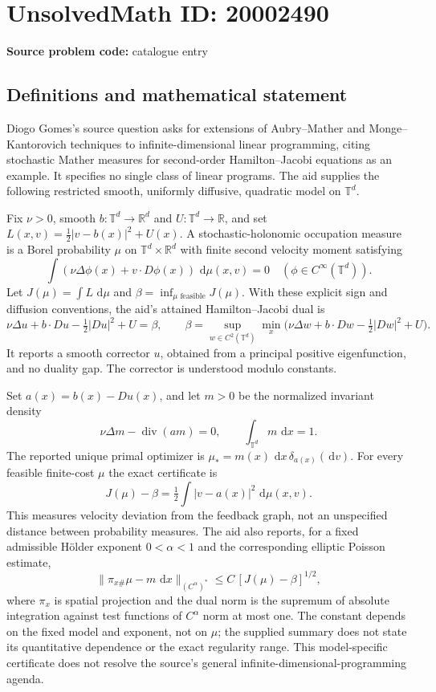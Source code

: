 \documentclass[11pt]{article}
\newcommand{\R}{\mathbb{R}}
\newcommand{\dd}{\,\mathrm{d}}
\begin{document}
\section*{UnsolvedMath ID: 20002490}
\textbf{Source problem code:} catalogue entry
\subsection{Definitions and mathematical statement}
Diogo Gomes's source question asks for extensions of Aubry--Mather and Monge--Kantorovich techniques to infinite-dimensional linear programming, citing stochastic Mather measures for second-order Hamilton--Jacobi equations as an example. It specifies no single class of linear programs. The aid supplies the following restricted smooth, uniformly diffusive, quadratic model on $\mathbb T^d$.

Fix $\nu>0$, smooth $b:\mathbb T^d\to\R^d$ and $U:\mathbb T^d\to\R$, and set $L(x,v)=\tfrac12|v-b(x)|^2+U(x)$. A stochastic-holonomic occupation measure is a Borel probability $\mu$ on $\mathbb T^d\times\R^d$ with finite second velocity moment satisfying
\[
 \int(\nu\Delta\phi(x)+v\cdot D\phi(x))\,\dd\mu(x,v)=0
 \quad(\phi\in C^\infty(\mathbb T^d)).
\]
Let $J(\mu)=\int L\,\dd\mu$ and $\beta=\inf_{\mu\text{ feasible}}J(\mu)$. With these explicit sign and diffusion conventions, the aid's attained Hamilton--Jacobi dual is
\[
 \nu\Delta u+b\cdot Du-\tfrac12|Du|^2+U=\beta,
 \qquad
 \beta=\sup_{w\in C^2(\mathbb T^d)}\min_x
 \bigl(\nu\Delta w+b\cdot Dw-\tfrac12|Dw|^2+U\bigr).
\]
It reports a smooth corrector $u$, obtained from a principal positive eigenfunction, and no duality gap. The corrector is understood modulo constants.

Set $a(x)=b(x)-Du(x)$, and let $m>0$ be the normalized invariant density
\[
 \nu\Delta m-\operatorname{div}(a m)=0,\qquad\int_{\mathbb T^d}m\,\dd x=1.
\]
The reported unique primal optimizer is $\mu_*=m(x)\,\dd x\,\delta_{a(x)}(\dd v)$. For every feasible finite-cost $\mu$ the exact certificate is
\[
 J(\mu)-\beta=\tfrac12\int|v-a(x)|^2\,\dd\mu(x,v).
\]
This measures velocity deviation from the feedback graph, not an unspecified distance between probability measures. The aid also reports, for a fixed admissible H\"older exponent $0<\alpha<1$ and the corresponding elliptic Poisson estimate,
\[
 \|\pi_{x\#}\mu-m\,\dd x\|_{(C^\alpha)^*}
 \le C\,[J(\mu)-\beta]^{1/2},
\]
where $\pi_x$ is spatial projection and the dual norm is the supremum of absolute integration against test functions of $C^\alpha$ norm at most one. The constant depends on the fixed model and exponent, not on $\mu$; the supplied summary does not state its quantitative dependence or the exact regularity range. This model-specific certificate does not resolve the source's general infinite-dimensional-programming agenda.
\end{document}
